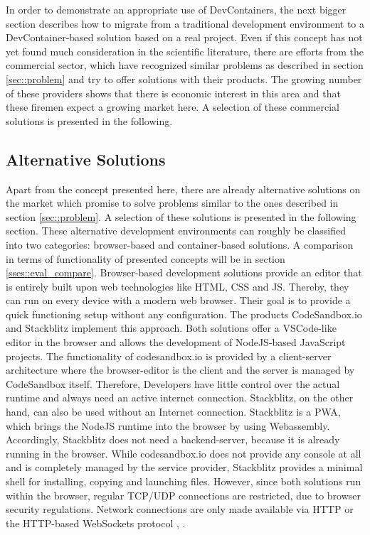     In order to demonstrate an appropriate use of DevContainers, the next bigger section describes how to migrate from a traditional development environment to a DevContainer-based solution based on a real project. Even if this concept has not yet found much consideration in the scientific literature, there are efforts from the commercial sector, which have recognized similar problems as described in section \ref{sec::problem} and try to offer solutions with their products. The growing number of these providers shows that there is economic interest in this area and that these firemen expect a growing market here. A selection of these commercial solutions is presented in the following.

    \subsection{Alternative Solutions}\label{ssec::alternatives}
    Apart from the concept presented here, there are already alternative solutions on the market which promise to solve problems similar to the ones described in section \ref{sec::problem}. A selection of these solutions is presented in the following section. These alternative development environments can roughly be classified into two categories: browser-based and container-based solutions. A comparison in terms of functionality of presented concepts will be in section \ref{sses::eval_compare}.
    Browser-based development solutions provide an editor that is entirely built upon web technologies like HTML, CSS and \ac{JS}. Thereby, they can run on every device with a modern web browser. Their goal is to provide a quick functioning setup without any configuration.\newline
    The products CodeSandbox.io and Stackblitz implement this approach. Both solutions offer a \ac{VSCode}-like editor in the browser and allows the development of NodeJS-based JavaScript projects. The functionality of codesandbox.io is provided by a client-server architecture where the browser-editor is the client and the server is managed by CodeSandbox itself. Therefore, Developers have little control over the actual runtime and always need an active internet connection. Stackblitz, on the other hand, can also be used without an Internet connection. Stackblitz is a \ac{PWA}, which brings the NodeJS runtime into the browser by using Webassembly. Accordingly, Stackblitz does not need a backend-server, because it is already running in the browser. While codesandbox.io does not provide any console at all and is completely managed by the service provider, Stackblitz provides a minimal shell for installing, copying and launching files. However, since both solutions run within the browser, regular TCP/UDP connections are restricted, due to browser security regulations. Network connections are only made available via HTTP or the HTTP-based WebSockets protocol \cite{codesandbox}, \cite{stackblitz}.

